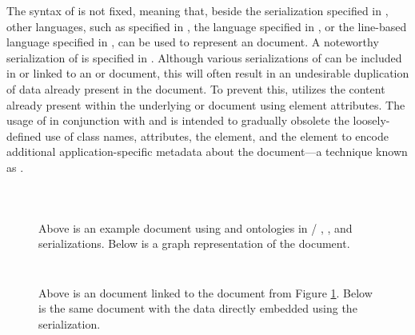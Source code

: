 \documentclass{book}
\begin{document}
The syntax of  is not fixed, meaning that, beside the
 serialization specified in \cite{lassira99}, other languages,
such as  specified in \cite{sporny14}, the 
language specified in \cite{beckett14:turtle}, or the line-based 
language specified in \cite{beckett14:nt}, can be used to represent an
 document. A noteworthy serialization of  is
 specified in \cite{adida08}. Although various serializations of
 can be included in or linked to an  or
 document, this will often result in an undesirable duplication
of data already present in the document. To prevent this, 
utilizes the content already present within the underlying  or
 document using element attributes. The usage of 
in conjunction with  and  is intended to gradually
obsolete the loosely-defined use of  class names, attributes, the
 element, and the  element to encode additional
application-specific metadata about the document---a technique known as
.

\begin{figure}
  \inputminted{xml}{examples/02/john.rd}
  \inputminted{text}{examples/02/john.nt}
  \inputminted{text}{examples/02/john.ttl}
  \caption{Above is an example  document using  and
     ontologies in /%
    , , and %
     serializations. Below is a graph representation of the
    document.}\label{fig:rdf-doc}\bigskip
  
\end{figure}

\begin{figure}[t!]
  \inputminted{html}{examples/02/john.html.linked-rdf}
  \caption{Above is an  document linked to the 
    document from Figure \ref{fig:rdf-doc}. Below is the same 
    document with the  data directly embedded using the
     serialization.}\bigskip
  \inputminted{html}{examples/02/john.html.rdfa}
\end{figure}

        
\end{document}
